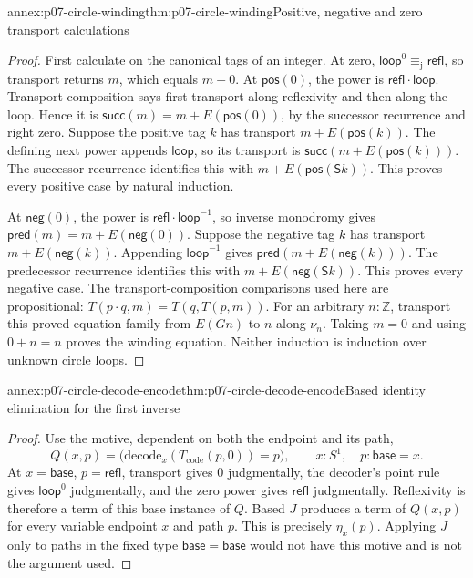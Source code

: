 \begin{annexitem}{annex:p07-circle-winding}{thm:p07-circle-winding}{Positive, negative and zero transport calculations}
\begin{proof}
First calculate on the canonical tags of an integer. At zero,
\(\mathsf{loop}^{0}\equiv_{\mathrm j}\mathsf{refl}\), so transport
returns \(m\), which equals \(m+0\).
At \(\mathsf{pos}(0)\), the power is
\(\mathsf{refl}\cdot\mathsf{loop}\). Transport composition says first
transport along reflexivity and then along the loop. Hence it is
\(\mathsf{succ}(m)=m+E(\mathsf{pos}(0))\), by the successor recurrence
and right zero. Suppose the positive tag \(k\) has transport
\(m+E(\mathsf{pos}(k))\). The defining next power appends
\(\mathsf{loop}\), so its transport is
\(\mathsf{succ}(m+E(\mathsf{pos}(k)))\).
The successor recurrence identifies this with
\(m+E(\mathsf{pos}(\mathsf Sk))\). This proves every positive case
by natural induction.

At \(\mathsf{neg}(0)\), the power is
\(\mathsf{refl}\cdot\mathsf{loop}^{-1}\), so inverse monodromy
gives \(\mathsf{pred}(m)=m+E(\mathsf{neg}(0))\).
Suppose the negative tag \(k\) has transport
\(m+E(\mathsf{neg}(k))\). Appending \(\mathsf{loop}^{-1}\)
gives \(\mathsf{pred}(m+E(\mathsf{neg}(k)))\).
The predecessor recurrence identifies this with
\(m+E(\mathsf{neg}(\mathsf Sk))\). This proves every negative case.
The transport-composition comparisons used here are propositional:
\(T(p\cdot q,m)=T(q,T(p,m))\).
For an arbitrary \(n:\mathbb Z\), transport this proved equation
family from \(E(Gn)\) to \(n\) along \(\nu_n\).
Taking \(m=0\) and using \(0+n=n\) proves the winding equation.
Neither induction is induction over unknown circle loops.
\end{proof}
\end{annexitem}

\begin{annexitem}{annex:p07-circle-decode-encode}{thm:p07-circle-decode-encode}{Based identity elimination for the first inverse}
\begin{proof}
Use the motive, dependent on both the endpoint and its path,
\[
Q(x,p)=\bigl(\mathrm{decode}_x
             (T_{\mathrm{code}}(p,0))=p\bigr),
\qquad x:S^1,\quad p:\mathsf{base}=x.
\]
At \(x=\mathsf{base}\), \(p=\mathsf{refl}\), transport gives
\(0\) judgmentally, the decoder's point rule gives
\(\mathsf{loop}^0\) judgmentally, and the zero power gives
\(\mathsf{refl}\) judgmentally. Reflexivity is therefore a term of
this base instance of \(Q\).
Based \(J\) produces a term of \(Q(x,p)\) for every variable
endpoint \(x\) and path \(p\). This is precisely \(\eta_x(p)\).
Applying \(J\) only to paths in the fixed type
\(\mathsf{base}=\mathsf{base}\) would not have this motive and is
not the argument used.
\end{proof}
\end{annexitem}

